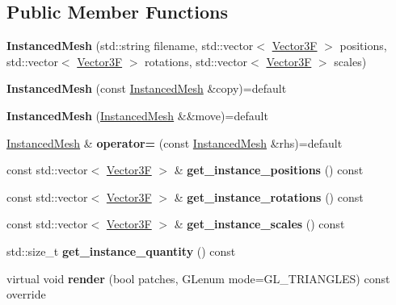 \subsection*{Public Member Functions}
\begin{DoxyCompactItemize}
\item 
\mbox{\label{class_instanced_mesh_a21071278154b9446677016224861bffd}} 
{\bfseries Instanced\+Mesh} (std\+::string filename, std\+::vector$<$ \mbox{\hyperlink{class_vector3}{Vector3F}} $>$ positions, std\+::vector$<$ \mbox{\hyperlink{class_vector3}{Vector3F}} $>$ rotations, std\+::vector$<$ \mbox{\hyperlink{class_vector3}{Vector3F}} $>$ scales)
\item 
\mbox{\label{class_instanced_mesh_a3457a47b5d850fbdae6b49a8d4bfadd1}} 
{\bfseries Instanced\+Mesh} (const \mbox{\hyperlink{class_instanced_mesh}{Instanced\+Mesh}} \&copy)=default
\item 
\mbox{\label{class_instanced_mesh_abdc6da71131053efc82bd3377aabc1ac}} 
{\bfseries Instanced\+Mesh} (\mbox{\hyperlink{class_instanced_mesh}{Instanced\+Mesh}} \&\&move)=default
\item 
\mbox{\label{class_instanced_mesh_afce42cfdb1ff1abcd70c418fd0dd0503}} 
\mbox{\hyperlink{class_instanced_mesh}{Instanced\+Mesh}} \& {\bfseries operator=} (const \mbox{\hyperlink{class_instanced_mesh}{Instanced\+Mesh}} \&rhs)=default
\item 
\mbox{\label{class_instanced_mesh_afe65a816eab00c2d6217f8cd4f8d7749}} 
const std\+::vector$<$ \mbox{\hyperlink{class_vector3}{Vector3F}} $>$ \& {\bfseries get\+\_\+instance\+\_\+positions} () const
\item 
\mbox{\label{class_instanced_mesh_a0618a1d06d7f63edfd7d76f9d51c10de}} 
const std\+::vector$<$ \mbox{\hyperlink{class_vector3}{Vector3F}} $>$ \& {\bfseries get\+\_\+instance\+\_\+rotations} () const
\item 
\mbox{\label{class_instanced_mesh_a6f3e0e63ec4dbcf7715bdb44bc83ecaa}} 
const std\+::vector$<$ \mbox{\hyperlink{class_vector3}{Vector3F}} $>$ \& {\bfseries get\+\_\+instance\+\_\+scales} () const
\item 
\mbox{\label{class_instanced_mesh_af35eca32f1270f3f996f508e7cc9d01d}} 
std\+::size\+\_\+t {\bfseries get\+\_\+instance\+\_\+quantity} () const
\item 
\mbox{\label{class_instanced_mesh_aab465896e76ef3c0b203cde8cd196e12}} 
virtual void {\bfseries render} (bool patches, G\+Lenum mode=G\+L\+\_\+\+T\+R\+I\+A\+N\+G\+L\+ES) const override
\end{DoxyCompactItemize}

